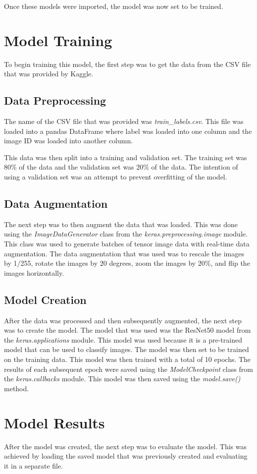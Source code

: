\documentclass[
	a4paper, %
	10pt, %
	unnumberedsections, %
	twoside, %
]{LTJournalArticle}
\begin{document}
Once these models were imported, the model was now set to be trained.

\section{Model Training}

To begin training this model, the first step was to get the data from the CSV file that was provided by Kaggle.

\subsection{Data Preprocessing}

The name of the CSV file that was provided was \textit{train\_labels.csv}. This file was loaded into a pandas DataFrame where label was loaded into one column and the image ID was loaded into another
column.

This data was then split into a training and validation set. The training set was 80\% of the data and the validation set was 20\% of the data. The intention of using a validation set was an attempt to
prevent overfitting of the model.

\subsection{Data Augmentation}

The next step was to then augment the data that was loaded. This was done using the \textit{ImageDataGenerator} class from the \textit{keras.preprocessing.image} module. This class was used to generate
batches of tensor image data with real-time data augmentation. The data augmentation that was used was to rescale the images by 1/255, rotate the images by 20 degrees, zoom the images by 20\%, and flip
the images horizontally.

\subsection{Model Creation}

After the data was processed and then subsequently augmented, the next step was to create the model. The model that was used was the ResNet50 model from the \textit{keras.applications} module. This model
was used because it is a pre-trained model that can be used to classify images. The model was then set to be trained on the training data. This model was then trained with a total of 10 epochs. The results
of each subsequent epoch were saved using the \textit{ModelCheckpoint} class from the \textit{keras.callbacks} module. This model was then saved using the \textit{model.save()} method. 

\section{Model Results}

After the model was created, the next step was to evaluate the model. This was achieved by loading the saved model that was previously created and evaluating it in a separate file.
\end{document}
